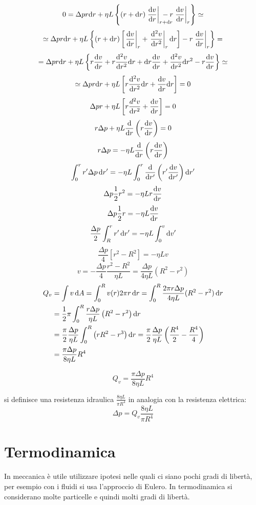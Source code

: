 \[0=\Delta p r\ud r+\eta L\left\{(r+\ud r)\left.\frac{\ud v}{\ud r}\right|_{r+\ud r}\!\!\!\!\!\!\!\!\!\!-r\left.\frac{\ud v}{\ud r}\right|_r\right\}\simeq\]
\[\simeq\Delta p r\mathrm{d} r+\eta L\left\{(r+\mathrm{d} r)\left[\left.\frac{\mathrm{d} v}{\mathrm{d} r}\right|_r+\left.\frac{\mathrm{d}^2 v}{\mathrm{d} r^2}\right|_r\mathrm{d} r\right]-r\left.\frac{\mathrm{d} v}{\mathrm{d} r}\right|_r\right\}=\]
\[=\Delta p r\mathrm{d} r+\eta L\left\{r\frac{\mathrm{d} v}{\mathrm{d} r}+r\frac{\mathrm{d}^2 v}{\mathrm{d} r^2}\mathrm{d} r+\mathrm{d} r\frac{\mathrm{d} v}{\mathrm{d} r}+\frac{\mathrm{d}^2 v}{\mathrm{d} r^2}\mathrm{d} r^2-r\frac{\mathrm{d} v}{\mathrm{d} r}\right\}\simeq\]
\[\simeq\Delta p r \mathrm{d} r+\eta L\left[r\frac{\mathrm{d}^2 v}{\mathrm{d} r^2}\mathrm{d} r+\frac{\mathrm{d} v}{\mathrm{d} r}\mathrm{d} r\right]=0\]
\[\Delta p r+\eta L\left[r\frac{d^2 v}{\mathrm{d} r^2}+\frac{\mathrm{d} v}{\mathrm{d} r}\right]=0\]
\[r\Delta p+\eta L\frac{\mathrm{d}}{\mathrm{d} r}\left(r \frac{\mathrm{d} v}{\mathrm{d} r}\right)=0\]
\[r\Delta p=-\eta L\frac{\mathrm{d}}{\mathrm{d} r}\left(r\frac{\mathrm{d} v}{\mathrm{d} r}\right)\]
\[\int_0^r r'\Delta p\,\mathrm{d} r'=-\eta L\int_0^r\frac{\mathrm{d}}{\mathrm{d} r'}\left(r'\frac{\mathrm{d} v}{\mathrm{d} r'}\right)\mathrm{d} r'\]
\[\Delta p\frac{1}{2}r^2=-\eta L r\frac{\mathrm{d} v}{\mathrm{d} r}\]
\[\Delta p\frac{1}{2}r=-\eta L \frac{\mathrm{d} v}{\mathrm{d} r}\]
\[\frac{\Delta p}{2}\int_R^r r'\,\mathrm{d} r'=-\eta L\int_0^v \mathrm{d} v'\]
\[\frac{\Delta p}{4}\left[r^2-R^2\right]=-\eta Lv\]
\[v=-\frac{\Delta p}{4}\frac{r^2-R^2}{\eta L}=\frac{\Delta p}{4\eta L}\left(R^2-r^2\right)\]
\begin{align*}
   Q_v & =\int v \,\mathrm{d} A=\int_0^R v(r)2\pi r\,\mathrm{d} r=\int_0^R\frac{2\pi r\Delta p}{4\eta L}(R^2-r^2)\,\mathrm{d} r                                                     \\
       & =\frac{1}{2}\pi\int_0^R\frac{r\Delta p}{\eta L}\left(R^2-r^2\right)\mathrm{d} r                                                                              \\
       & =\frac{\pi}{2}\frac{\Delta p}{\eta L}\int_0^R \left(rR^2-r^3\right)\mathrm{d} r=\frac{\pi}{2}\frac{\Delta p}{\eta L}\left(\frac{R^4}{2}-\frac{R^4}{4}\right) \\
       & =\frac{\pi\Delta p}{8\eta L}R^4
\end{align*}
\begin{legge}[Poiseuille]
   \begin{equation}
      Q_v=\frac{\pi\Delta p}{8\eta L}R^4
   \end{equation}
\end{legge}
si definisce una resistenza idraulica $\frac{8\eta L}{\pi R^4}$ in analogia con la resistenza elettrica:
\[
\Delta p = Q_v \frac{8\eta L}{\pi R^4}
\]


\chapter{Termodinamica}
\minitoc
In meccanica è utile utilizzare ipotesi nelle quali ci siano pochi gradi di libertà, per esempio con i fluidi si usa l'approccio di Eulero. In termodinamica si considerano molte particelle e quindi molti gradi di libertà.

